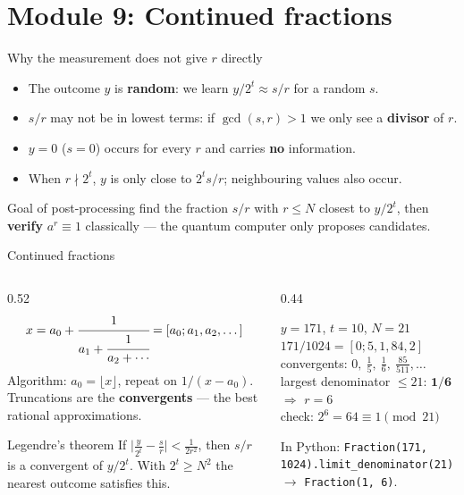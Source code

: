 \documentclass[aspectratio=169,11pt]{beamer}
\newcommand{\hl}[1]{{\color{qorange}\textbf{#1}}}
\newcommand{\key}[1]{{\color{qdark}\textbf{#1}}}
\begin{document}
\section{Module 9: Continued fractions}
\begin{frame}[label=fCFWhy]{Why the measurement does not give $r$ directly}
  \small
  \begin{itemize}\itemsep2pt
    \item The outcome $y$ is \key{random}: we learn $y/2^t \approx s/r$ for a random $s$.
    \item $s/r$ may not be in lowest terms: if $\gcd(s, r) > 1$ we only see a \key{divisor} of $r$.
    \item $y = 0$ ($s = 0$) occurs for every $r$ and carries \hl{no} information.
    \item When $r \nmid 2^t$, $y$ is only close to $2^ts/r$; neighbouring values also occur.
  \end{itemize}
  \begin{block}{Goal of post-processing}
    \small find the fraction $s/r$ with $r \le N$ closest to $y/2^t$, then \key{verify} $a^r \equiv 1$ classically --- the quantum computer only proposes candidates.
  \end{block}
\end{frame}

\begin{frame}[label=fCF]{Continued fractions}
  \begin{columns}[T]
    \begin{column}{0.52\textwidth}
      \small
      \[ x = a_0 + \cfrac{1}{a_1 + \cfrac{1}{a_2 + \cdots}} = [a_0; a_1, a_2, \dots] \]
      Algorithm: $a_0 = \lfloor x\rfloor$, repeat on $1/(x - a_0)$. Truncations are the \key{convergents} --- the best rational approximations.
      \begin{block}{Legendre's theorem}
        \scriptsize If $\big|\frac{y}{2^t} - \frac sr\big| < \frac{1}{2r^2}$, then $s/r$ is a convergent of $y/2^t$. With $2^t \ge N^2$ the nearest outcome satisfies this.
      \end{block}
    \end{column}
    \begin{column}{0.44\textwidth}
      \begin{exampleblock}{$y = 171$, $t = 10$, $N = 21$}
        \small
        $171/1024 = [0; 5, 1, 84, 2]$\\
        convergents: $0,\ \frac15,\ \frac16,\ \frac{85}{511}, \dots$\\
        largest denominator $\le 21$: $\mathbf{1/6}$ $\Rightarrow$ $r = 6$\\
        check: $2^6 = 64 \equiv 1 \pmod{21}$ \checkmark
      \end{exampleblock}
      \scriptsize In Python: \texttt{Fraction(171, 1024).limit\_denominator(21)} $\to$ \texttt{Fraction(1, 6)}.
    \end{column}
  \end{columns}
\end{frame}
\end{document}
